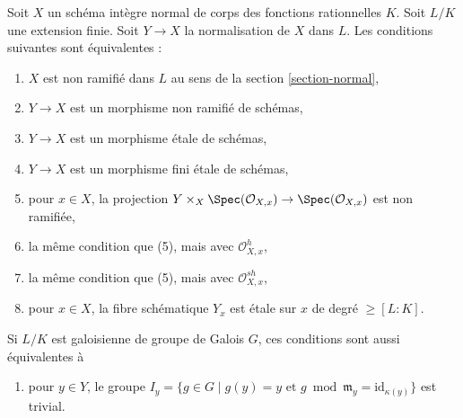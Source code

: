 \begin{lemma}
\label{lemma-unramified}
Soit $X$ un schéma intègre normal de corps des fonctions rationnelles $K$.
Soit $L/K$ une extension finie. Soit $Y \to X$ la normalisation
de $X$ dans $L$. Les conditions suivantes sont équivalentes :
\begin{enumerate}
\item $X$ est non ramifié dans $L$ au sens de la section \ref{section-normal},
\item $Y \to X$ est un morphisme non ramifié de schémas,
\item $Y \to X$ est un morphisme étale de schémas,
\item $Y \to X$ est un morphisme fini étale de schémas,
\item pour $x \in X$, la projection
$Y \times_X \Spec(\mathcal{O}_{X, x}) \to \Spec(\mathcal{O}_{X, x})$
est non ramifiée,
\item la même condition que (5), mais avec $\mathcal{O}_{X, x}^h$,
\item la même condition que (5), mais avec $\mathcal{O}_{X, x}^{sh}$,
\item pour $x \in X$, la fibre schématique $Y_x$
est étale sur $x$ de degré $\geq [L : K]$.
\end{enumerate}
Si $L/K$ est galoisienne de groupe de Galois $G$, ces conditions sont aussi
équivalentes à
\begin{enumerate}
\item[(9)] pour $y \in Y$, le groupe
$I_y = \{g \in G \mid g(y) = y\text{ et }
g \bmod \mathfrak m_y = \text{id}_{\kappa(y)}\}$ est trivial.
\end{enumerate}
\end{lemma}

